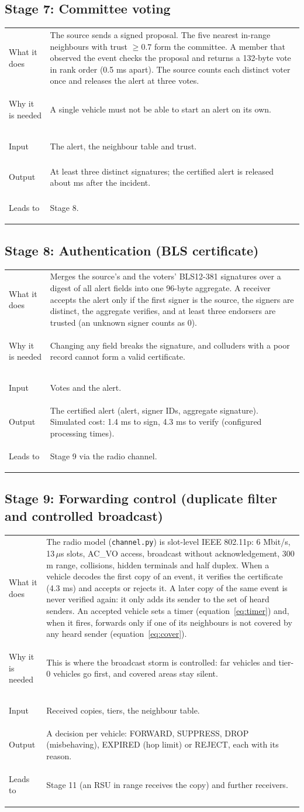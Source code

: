 \documentclass[11pt, a4paper]{article}
\makeatletter
\newcommand{\stage}[5]{%
  \par\noindent\begin{tabular}{@{}>{\bfseries\raggedright\arraybackslash}p{0.17\textwidth}p{0.79\textwidth}@{}}
  What it does & #1\\
  Why it is needed & #2\\
  Input & #3\\
  Output & #4\\
  Leads to & #5\\
  \end{tabular}\par\vspace{4pt}}
\makeatother
\begin{document}
\subsection{Stage 7: Committee voting}
\stage{The source sends a signed proposal. The five nearest in-range neighbours with trust $\geq 0.7$ form the committee.
A member that observed the event checks the proposal and returns a 132-byte vote in rank order (0.5 ms apart). The source
counts each distinct voter once and releases the alert at three votes.}
{A single vehicle must not be able to start an alert on its own.}
{The alert, the neighbour table and trust.}
{At least three distinct signatures; the certified alert is released about \NQuorumMs{} ms after the incident.}
{Stage 8.}

\subsection{Stage 8: Authentication (BLS certificate)}
\stage{Merges the source's and the voters' BLS12-381 signatures over a digest of all alert fields into one 96-byte
aggregate. A receiver accepts the alert only if the first signer is the source, the signers are distinct, the aggregate
verifies, and at least three endorsers are trusted (an unknown signer counts as 0).}
{Changing any field breaks the signature, and colluders with a poor record cannot form a valid certificate.}
{Votes and the alert.}
{The certified alert (alert, signer IDs, aggregate signature). Simulated cost: 1.4 ms to sign, 4.3 ms to verify
(configured processing times).}
{Stage 9 via the radio channel.}

\subsection{Stage 9: Forwarding control (duplicate filter and controlled broadcast)}
\stage{The radio model (\texttt{channel.py}) is slot-level IEEE 802.11p: 6 Mbit/s, 13\,$\mu$s slots, AC\_VO access,
broadcast without acknowledgement, 300 m range, collisions, hidden terminals and half duplex. When a vehicle decodes the
first copy of an event, it verifies the certificate (4.3 ms) and accepts or rejects it. A later copy of the same event is
never verified again: it only adds its sender to the set of heard senders. An accepted vehicle sets a timer
(equation~\ref{eq:timer}) and, when it fires, forwards only if one of its neighbours is not covered by any heard sender
(equation~\ref{eq:cover}).}
{This is where the broadcast storm is controlled: far vehicles and tier-0 vehicles go first, and covered areas stay
silent.}
{Received copies, tiers, the neighbour table.}
{A decision per vehicle: FORWARD, SUPPRESS, DROP (misbehaving), EXPIRED (hop limit) or REJECT, each with its reason.}
{Stage 11 (an RSU in range receives the copy) and further receivers.}
\end{document}
